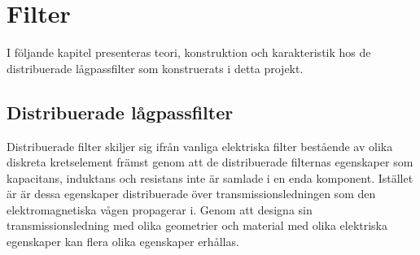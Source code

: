 \documentclass[main.tex]{subfiles}
\begin{document}
\chapter{Filter}
\label{ch:filter}
I följande kapitel presenteras teori, konstruktion och karakteristik hos de distribuerade lågpassfilter som konstruerats i detta projekt.



\section{Distribuerade lågpassfilter}
Distribuerade filter skiljer sig ifrån vanliga elektriska filter bestående av olika diskreta kretselement främst genom att de distribuerade filternas egenskaper som kapacitans, induktans och resistans inte är samlade i en enda komponent. Istället är är dessa egenskaper distribuerade över transmissionsledningen som den elektromagnetiska vågen propagerar i. Genom att designa sin transmissionsledning med olika geometrier och material med olika elektriska egenskaper kan flera olika egenskaper erhållas\cite{cheng}. 
\end{document}
